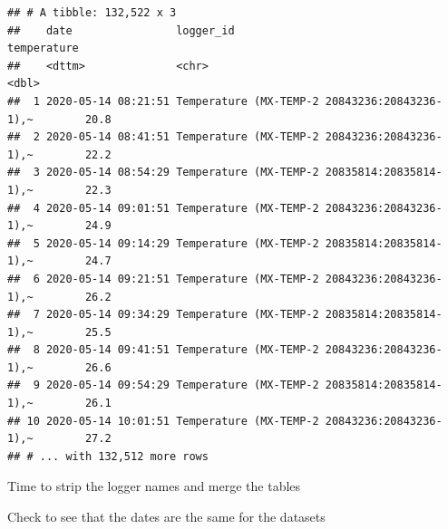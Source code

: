 \documentclass[]{article}
\newenvironment{Shaded}{\begin{snugshade}}{\end{snugshade}}
\newcommand{\DataTypeTok}[1]{\textcolor[rgb]{0.13,0.29,0.53}{#1}}
\newcommand{\KeywordTok}[1]{\textcolor[rgb]{0.13,0.29,0.53}{\textbf{#1}}}
\newcommand{\NormalTok}[1]{#1}
\newcommand{\OperatorTok}[1]{\textcolor[rgb]{0.81,0.36,0.00}{\textbf{#1}}}
\newcommand{\StringTok}[1]{\textcolor[rgb]{0.31,0.60,0.02}{#1}}
\begin{document}
\begin{verbatim}
## # A tibble: 132,522 x 3
##    date                logger_id                                     temperature
##    <dttm>              <chr>                                               <dbl>
##  1 2020-05-14 08:21:51 Temperature (MX-TEMP-2 20843236:20843236-1),~        20.8
##  2 2020-05-14 08:41:51 Temperature (MX-TEMP-2 20843236:20843236-1),~        22.2
##  3 2020-05-14 08:54:29 Temperature (MX-TEMP-2 20835814:20835814-1),~        22.3
##  4 2020-05-14 09:01:51 Temperature (MX-TEMP-2 20843236:20843236-1),~        24.9
##  5 2020-05-14 09:14:29 Temperature (MX-TEMP-2 20835814:20835814-1),~        24.7
##  6 2020-05-14 09:21:51 Temperature (MX-TEMP-2 20843236:20843236-1),~        26.2
##  7 2020-05-14 09:34:29 Temperature (MX-TEMP-2 20835814:20835814-1),~        25.5
##  8 2020-05-14 09:41:51 Temperature (MX-TEMP-2 20843236:20843236-1),~        26.6
##  9 2020-05-14 09:54:29 Temperature (MX-TEMP-2 20835814:20835814-1),~        26.1
## 10 2020-05-14 10:01:51 Temperature (MX-TEMP-2 20843236:20843236-1),~        27.2
## # ... with 132,512 more rows
\end{verbatim}

Time to strip the logger names and merge the tables

\begin{Shaded}
\end{Shaded}

Check to see that the dates are the same for the datasets

\begin{Shaded}
\end{Shaded}
\end{document}

